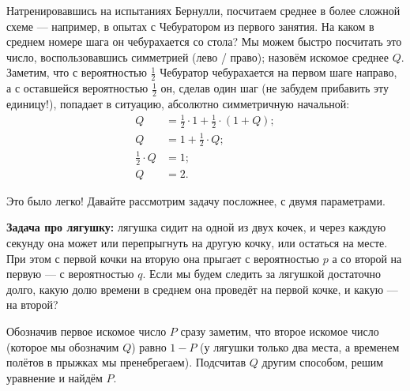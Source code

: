 \documentclass{article}
\begin{document}
Натренировавшись на испытаниях Бернулли, посчитаем среднее в более сложной схеме --- например, в опытах с Чебуратором из первого занятия. 
На каком в среднем номере шага он чебурахается со стола? 
Мы можем быстро посчитать это число, воспользовавшись симметрией (лево / право); назовём искомое среднее $Q$. 
Заметим, что с вероятностью $\tfrac12$ Чебуратор чебурахается на первом шаге направо, а с оставшейся вероятностью $\tfrac12$ он, 
сделав один шаг (не забудем прибавить эту единицу!), 
попадает в ситуацию, абсолютно симметричную начальной:
\begin{align*}
Q&=\tfrac12\cdot1+\tfrac12\cdot(1+Q);
\\
Q&=1+\tfrac12\cdot Q;
\\
\tfrac12\cdot Q&=1;
\\
Q&=2.
\end{align*}

Это было легко! Давайте рассмотрим задачу посложнее, с двумя параметрами.

\noindent\textbf{Задача про лягушку:} 
лягушка сидит на одной из двух кочек, и через каждую секунду она может или перепрыгнуть на другую кочку, или остаться на месте. 
При этом с первой кочки на вторую она прыгает с вероятностью $p$ а со второй на первую --- с вероятностью $q$. 
Если мы будем следить за лягушкой достаточно долго, какую долю времени в среднем она проведёт на первой кочке, и какую --- на второй?

Обозначив первое искомое число $P$ сразу заметим, 
что второе искомое число (которое мы обозначим $Q$) 
равно $1-P$ 
(у лягушки только два места, а временем полётов в прыжках мы пренебрегаем). 
Подсчитав $Q$ другим способом, решим уравнение и найдём  $P$.
\end{document}
